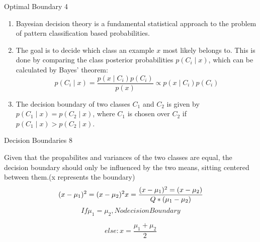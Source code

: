 \begin{questions}
	
	\begin{question}{Optimal Boundary }{4}		
	\begin{answer} 
			\begin{enumerate}
		\item 
		Bayesian decision theory is a fundamental statistical approach to the problem of pattern classification based probabilities.
		\item The goal is to decide which class an example $x$ most likely belongs to.
		This is done by comparing the class posterior probabilities $p(C_i\mid x)$, which can be calculated by Bayes' theorem:
		\[
		p(C_i \mid x)=\frac{p(x\mid C_i)p(C_i)}{p(x)} \propto p(x\mid C_i)p(C_i)
		\]
		\item The decision boundary of two classes $C_1$ and $C_2$ is given by $p(C_1\mid x)=p(C_2\mid x)$, where  $C_1$ is chosen over $C_2$ if $p(C_1\mid x)>p(C_2\mid x)$.
		\end{enumerate}
		
	\end{answer}
		
	\end{question}
	
	\begin{question}{Decision Boundaries  }{8}		
	\begin{answer} 
		Given that the propabilites and variances of the two classes are equal, the decision boundary should only be influenced by the two means, sitting centered between them.(x represents the boundary)
		\begin{equation}
		 (x-\mu_1)^2 = (x-\mu_2)^2 \\
		x = \frac{ (x-\mu_1)^2 = (x-\mu_2) }{Q * (\mu_1-\mu_2)}\\
		\end{equation}
		\begin{equation}
		If  \mu_1 = \mu_2 , No decision Boundary 
		\end{equation}

		\begin{equation}
		else: x =\frac{\mu_1 + \mu_2}{2}
		\end{equation}
			
	\end{answer}
		
	\end{question}
	

\end{questions}
